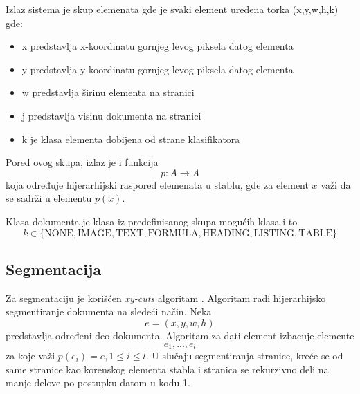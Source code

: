 \documentclass[]{amsart}
\begin{document}
Izlaz sistema je skup elemenata gde je svaki element uređena torka (x,y,w,h,k) gde:

\begin{itemize}
\item x predstavlja x-koordinatu gornjeg levog piksela datog elementa
\item y predstavlja y-koordinatu gornjeg levog piksela datog elementa
\item w predstavlja širinu elementa na stranici
\item j predstavlja visinu dokumenta na stranici
\item k je klasa elementa dobijena od strane klasifikatora
\end{itemize}

Pored ovog skupa, izlaz je i funkcija $$ p : A \to A $$ koja određuje hijerarhijski raspored elemenata u stablu, gde za element $ x $ važi da se
sadrži u elementu $ p(x) $. 

Klasa dokumenta je klasa iz predefinisanog skupa mogućih klasa i to $$ k \in \{\text{NONE}, \text{IMAGE}, \text{TEXT}, \text{FORMULA}, \text{HEADING}, \text{LISTING}, \text{TABLE}\} $$ 



\subsection{Segmentacija}
\label{sec:org7eee69b}

Za segmentaciju je korišćen \textit{xy-cuts} algoritam \cite{ha1995recursive}. Algoritam radi hijerarhijsko segmentiranje dokumenta na sledeći način. Neka $$ e = (x,y,w,h) $$ predstavlja određeni
deo dokumenta. Algoritam za dati element izbacuje elemente $$ e_1, ..., e_l $$ za koje važi $ p(e_i) = e, 1 \le i \le l $. U slučaju segmentiranja stranice, kreće se od same stranice kao korenskog elementa
stabla i stranica se rekurzivno deli na manje delove po postupku datom u kodu 1.
\end{document}
